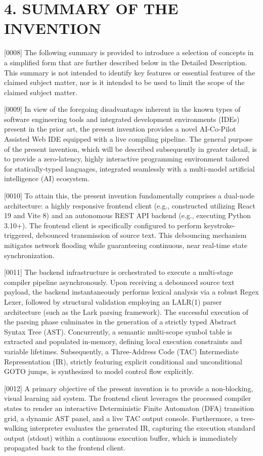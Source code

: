 \documentclass[12pt, a4paper]{article}
\begin{document}
\section*{4. SUMMARY OF THE INVENTION}
[0008] The following summary is provided to introduce a selection of concepts in a simplified form that are further described below in the Detailed Description. This summary is not intended to identify key features or essential features of the claimed subject matter, nor is it intended to be used to limit the scope of the claimed subject matter.

[0009] In view of the foregoing disadvantages inherent in the known types of software engineering tools and integrated development environments (IDEs) present in the prior art, the present invention provides a novel AI-Co-Pilot Assisted Web IDE equipped with a live compiling pipeline. The general purpose of the present invention, which will be described subsequently in greater detail, is to provide a zero-latency, highly interactive programming environment tailored for statically-typed languages, integrated seamlessly with a multi-model artificial intelligence (AI) ecosystem.

[0010] To attain this, the present invention fundamentally comprises a dual-node architecture: a highly responsive frontend client (e.g., constructed utilizing React 19 and Vite 8) and an autonomous REST API backend (e.g., executing Python 3.10+). The frontend client is specifically configured to perform keystroke-triggered, debounced transmission of source text. This debouncing mechanism mitigates network flooding while guaranteeing continuous, near real-time state synchronization.

[0011] The backend infrastructure is orchestrated to execute a multi-stage compiler pipeline asynchronously. Upon receiving a debounced source text payload, the backend instantaneously performs lexical analysis via a robust Regex Lexer, followed by structural validation employing an LALR(1) parser architecture (such as the Lark parsing framework). The successful execution of the parsing phase culminates in the generation of a strictly typed Abstract Syntax Tree (AST). Concurrently, a semantic multi-scope symbol table is extracted and populated in-memory, defining local execution constraints and variable lifetimes. Subsequently, a Three-Address Code (TAC) Intermediate Representation (IR), strictly featuring explicit conditional and unconditional GOTO jumps, is synthesized to model control flow explicitly.

[0012] A primary objective of the present invention is to provide a non-blocking, visual learning aid system. The frontend client leverages the processed compiler states to render an interactive Deterministic Finite Automaton (DFA) transition grid, a dynamic AST panel, and a live TAC output console. Furthermore, a tree-walking interpreter evaluates the generated IR, capturing the execution standard output (stdout) within a continuous execution buffer, which is immediately propagated back to the frontend client.
\end{document}
